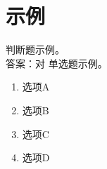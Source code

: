 \documentclass[12pt]{ctexart}
\begin{document}
\printanswers %
\section*{示例}
\begin{questions}
  \question 判断题示例。\ifprintanswers\\答案：对\fi
  \question 单选题示例。
  \begin{enumerate}[label=\Alph*.]
    \item 选项A
    \item 选项B
    \item 选项C
    \item 选项D
  \end{enumerate}
\end{questions}
\end{document}
